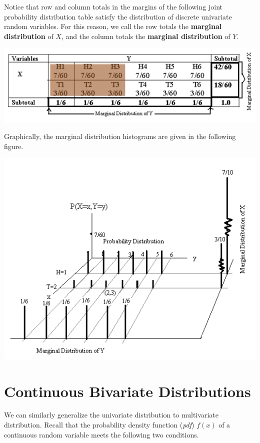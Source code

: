 \documentclass[
]{book}
\begin{document}
Notice that row and column totals in the margins of the following joint probability distribution table satisfy the distribution of discrete univariate random variables. For this reason, we call the row totals the \textbf{marginal distribution} of \(X\), and the column totals the \textbf{marginal distribution} of \(Y\).

\begin{center}\includegraphics[width=0.8\linewidth]{topic06/discreteMarginalDistribution} \end{center}

Graphically, the marginal distribution histograms are given in the following figure.

\begin{center}\includegraphics[width=0.8\linewidth]{topic06/discreteBivariateMarginalDistGraph} \end{center}

\hfill\break

\hypertarget{continuous-bivariate-distributions}{%
\section{Continuous Bivariate Distributions}\label{continuous-bivariate-distributions}}

We can similarly generalize the univariate distribution to multivariate distribution. Recall that the probability density function (\emph{pdf}) \(f(x)\) of a continuous random variable meets the following two conditions.
\end{document}
